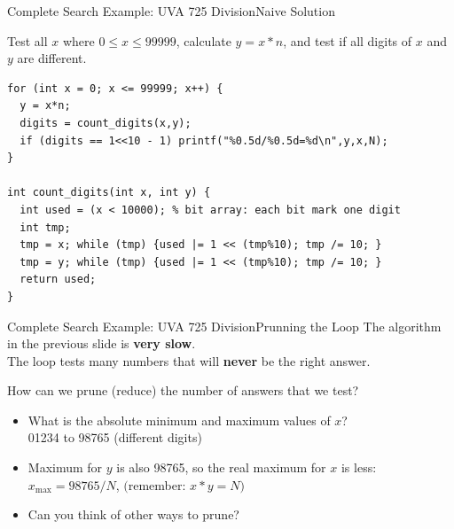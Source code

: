 \begin{frame}[fragile]{Complete Search Example: UVA 725 Division}{Naive Solution}
  \begin{block}{}
    Test all $x$ where $0 \leq x \leq 99999$, calculate $y = x*n$, and test if all digits of $x$ and $y$ are different.
  \end{block}

{\smaller
\begin{verbatim}
for (int x = 0; x <= 99999; x++) {
  y = x*n;
  digits = count_digits(x,y);
  if (digits == 1<<10 - 1) printf("%0.5d/%0.5d=%d\n",y,x,N);
}

int count_digits(int x, int y) {
  int used = (x < 10000); % bit array: each bit mark one digit
  int tmp;
  tmp = x; while (tmp) {used |= 1 << (tmp%10); tmp /= 10; }
  tmp = y; while (tmp) {used |= 1 << (tmp%10); tmp /= 10; }
  return used;
}
\end{verbatim}
  }
\end{frame}

\begin{frame}{Complete Search Example: UVA 725 Division}{Prunning the Loop}
  The algorithm in the previous slide is {\bf very slow}.\\
  The loop tests many numbers that will {\bf never} be the right answer.\bigskip

  How can we prune (reduce) the number of answers that we test?\bigskip

  \begin{itemize}
  \item What is the absolute minimum and maximum values of $x$?\\
    \hspace{1cm} 01234 to 98765 \hspace{2cm} (different digits)
    \bigskip

  \item Maximum for $y$ is also 98765, so the real maximum for $x$ is less:\\
    \hspace{1cm} $x_{\text{max}} = 98765/N$, \hspace{1.8cm} $($remember: $x * y = N)$
    \bigskip

  \item Can you think of other ways to prune?
  \end{itemize}
\end{frame}

